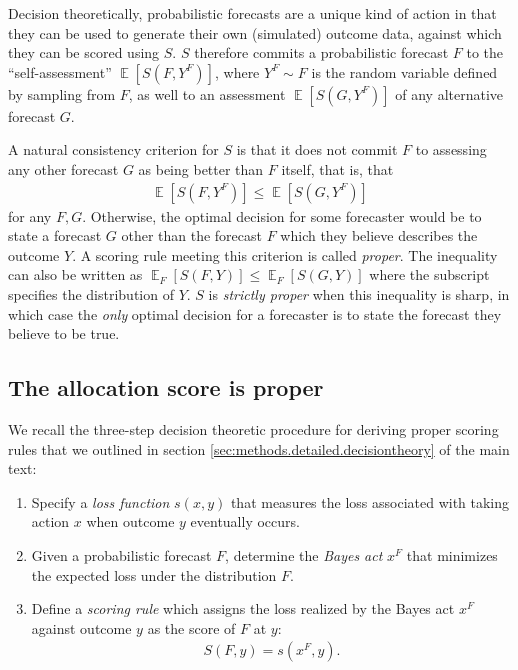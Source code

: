 \documentclass{article}\usepackage[]{graphicx}\usepackage[]{xcolor}
\DeclareMathOperator{\Ex}{\mathbb{E}}
\begin{document}
Decision theoretically, probabilistic forecasts are a unique kind of action in that they can be used to generate their
own (simulated) outcome data, against which they can be scored using $S$. $S$ therefore commits a probabilistic forecast
$F$ to the ``self-assessment'' $\Ex [S(F, Y^F)]$, where $Y^F \sim F$ is the random variable defined by sampling from
$F$, as well to an assessment $\Ex [S(G, Y^F)]$ of any alternative forecast $G$.

A natural consistency criterion for $S$ is that it does not commit $F$ to assessing any other forecast $G$ as being better than $F$ itself, that is, that
\begin{align}
\Ex [S(F, Y^F)] \leq \Ex [S(G, Y^F)] \label{eqn:prop_ineq}
\end{align} 
for any $F,G$. Otherwise, the optimal decision for some forecaster would be to state a forecast $G$ other than the forecast $F$
which they believe describes the outcome $Y$.
A scoring rule meeting this criterion is called \emph{proper}.  The inequality can also be written 
as $\Ex_F [S(F, Y)] \leq \Ex_F [S(G, Y)]$ where the subscript specifies the distribution of $Y$.  
$S$ is \emph{strictly proper} when this inequality is sharp, in which case the \emph{only} optimal decision for a forecaster is to state
the forecast they believe to be true.

\subsection{The allocation score is proper}
\label{sec:alloscore_proper}

We recall the three-step decision theoretic procedure for deriving proper scoring rules that we outlined in section \ref{sec:methods.detailed.decisiontheory} of the main text:
\begin{enumerate}
  \item Specify a \emph{loss function} $s(x, y)$ that measures the loss associated with taking action $x$ when outcome $y$ eventually occurs.
  \item Given a probabilistic forecast $F$, determine the \emph{Bayes act} $x^F$ that minimizes the expected loss under the distribution $F$.
  \item Define a \emph{scoring rule} which assigns the loss realized by the Bayes act $x^F$ against outcome $y$ as the score of $F$ at $y$:
  \begin{align}
    S(F, y) = s(x^F, y). \label{eqn:bayes_sr}
  \end{align}
\end{enumerate}
\end{document}
